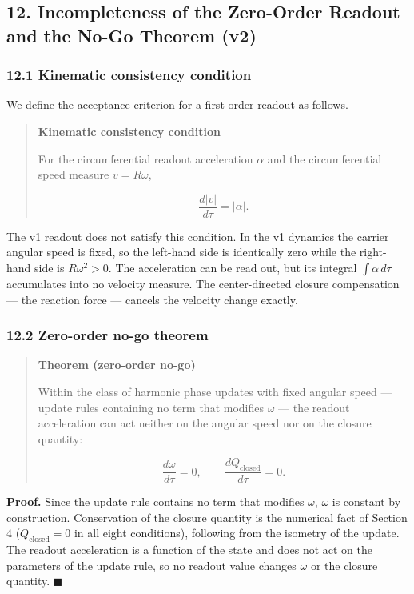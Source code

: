 \documentclass[
  a4paper,
]{article}
\begin{document}
\subsection{12. Incompleteness of the Zero-Order Readout and the No-Go
Theorem
(v2)}\label{incompleteness-of-the-zero-order-readout-and-the-no-go-theorem-v2}

\subsubsection{12.1 Kinematic consistency
condition}\label{kinematic-consistency-condition}

We define the acceptance criterion for a first-order readout as follows.

\begin{quote}
\textbf{Kinematic consistency condition}

For the circumferential readout acceleration \(\alpha\) and the
circumferential speed measure \(v=R\omega\),

\[
\frac{d\lvert v\rvert}{d\tau}=\lvert\alpha\rvert.
\]
\end{quote}

The v1 readout does not satisfy this condition. In the v1 dynamics the
carrier angular speed is fixed, so the left-hand side is identically
zero while the right-hand side is \(R\omega^2>0\). The acceleration can
be read out, but its integral \(\int\alpha\,d\tau\) accumulates into no
velocity measure. The center-directed closure compensation --- the
reaction force --- cancels the velocity change exactly.

\subsubsection{12.2 Zero-order no-go
theorem}\label{zero-order-no-go-theorem}

\begin{quote}
\textbf{Theorem (zero-order no-go)}

Within the class of harmonic phase updates with fixed angular speed ---
update rules containing no term that modifies \(\omega\) --- the readout
acceleration can act neither on the angular speed nor on the closure
quantity:

\[
\frac{d\omega}{d\tau}=0,
\qquad
\frac{dQ_{\mathrm{closed}}}{d\tau}=0.
\]
\end{quote}

\textbf{Proof.} Since the update rule contains no term that modifies
\(\omega\), \(\omega\) is constant by construction. Conservation of the
closure quantity is the numerical fact of Section 4
(\(Q_{\mathrm{closed}}=0\) in all eight conditions), following from the
isometry of the update. The readout acceleration is a function of the
state and does not act on the parameters of the update rule, so no
readout value changes \(\omega\) or the closure quantity.
\(\blacksquare\)
\end{document}
